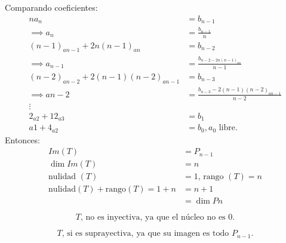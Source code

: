 \documentclass{article}
\begin{document}
		Comparando coeficientes:
		\begin{equation*}
			\begin{aligned}
				na_{n} 		 &=b_{n-1} \\
				\implies a_n &= \frac{b_{n-1}}{n} \\
				(n-1)_{an-1}+2n(n-1)_{an} &=b_{n-2} \\
				\implies a_{n-1} &= \frac{b_{n-2-2n(n-1)_{an}}}{n-1} \\
				(n-2)_{an-2}+2(n-1)(n-2)_{an-1} &=b_{n-3} \\
				\implies an-2 &= \frac{b_{n-3}-2(n-1)(n-2)_{an-1}}{n-2} \\
				\vdots \\
				2_{a2}+12_{a3} &=b_1 \\
				a1+4_{a2} &=b_0, a_0 \text{ libre.}
			\end{aligned}
		\end{equation*}
		Entonces:
		\begin{equation*}
			\begin{aligned}
				Im(T) &=P_{n-1}\\
				\dim Im(T) &=n \\
				\text{nulidad }(T) &=1
				\text{, rango }(T) =n \\
				\text{nulidad}(T)+\text{rango}(T)=1+n
				&=n+1 \\
				&=\dim Pn
			\end{aligned}
		\end{equation*}
		
		\[
		\boxed{T\text{, no es inyectiva, ya que el núcleo no es }0.}
		\]
		
		\[
		\boxed{T\text{, si es suprayectiva, ya que su imagen es todo }P_{n-1}.}
		\]
		
\end{document}
